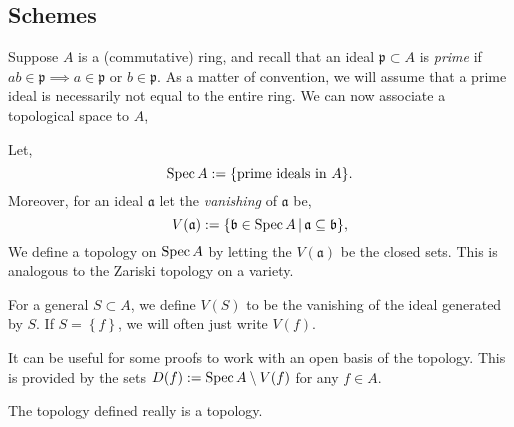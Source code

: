 \documentclass[000-main.tex]{subfiles}
\begin{document}
\subsection{Schemes}%
\label{sec:schemes}

Suppose $A$ is a (commutative) ring, and recall that an ideal $\mathfrak{p}\subset A$ is \emph{prime} if $ab\in\mathfrak{p}\implies a\in \mathfrak{p}$ or $b\in\mathfrak{p}$.
As a matter of convention, we will assume that a prime ideal is necessarily not equal to the entire ring.
We can now associate a topological space to $A$,
\begin{definition}
  Let,
  \[
	\operatorname{Spec} A := \lbrace\text{prime ideals in }A\rbrace.
  \]
  Moreover, for an ideal $\mathfrak{a}$ let the \emph{vanishing} of $\mathfrak{a}$ be,
  \[
	V(\mathfrak{a}) := \lbrace\mathfrak{b} \in \operatorname{Spec} A \, | \, \mathfrak{a} \subseteq \mathfrak{b} \rbrace,
  \]
  We define a topology on $\operatorname{Spec} A$ by letting the $V(\mathfrak{a})$ be the closed sets.
  This is analogous to the Zariski topology on a variety.
\end{definition}
For a general $S\subset A$, we define $V(S)$ to be the vanishing of the ideal generated by $S$.
If $S = \left\{ f \right\}$, we will often just write $V(f)$.

\begin{remark}
  It can be useful for some proofs to work with an open basis of the topology.
  This is provided by the sets $D(f) := \operatorname{Spec} A\setminus V(f)$ for any $f \in A$.
\end{remark}

\begin{lemma}
  The topology defined really is a topology.
\end{lemma} 
\end{document}
